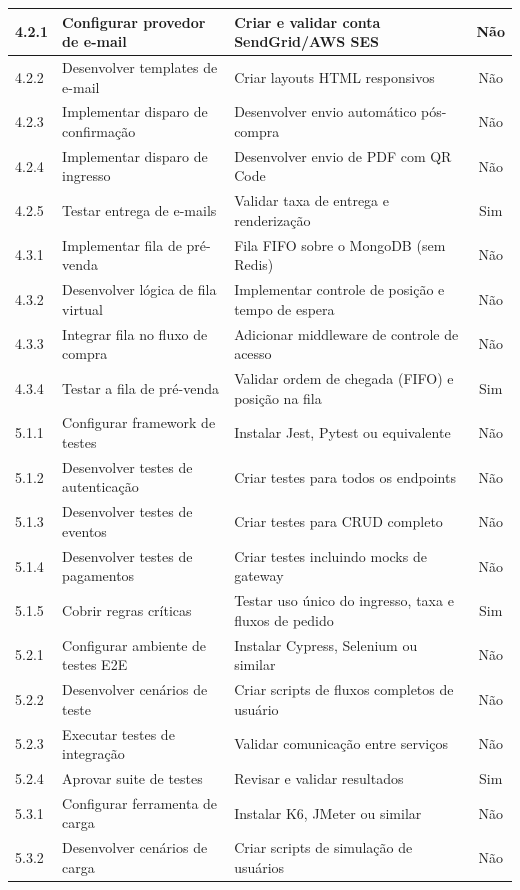 \begin{table}[H]
\begin{tabular}{|p{0.9cm}|p{6.2cm}|p{5.7cm}|c|}
4.2.1 & Configurar provedor de e-mail & Criar e validar conta SendGrid/AWS SES & Não \\ \hline
4.2.2 & Desenvolver templates de e-mail & Criar layouts HTML responsivos & Não \\ \hline
4.2.3 & Implementar disparo de confirmação & Desenvolver envio automático pós-compra & Não \\ \hline
4.2.4 & Implementar disparo de ingresso & Desenvolver envio de PDF com QR Code & Não \\ \hline
4.2.5 & Testar entrega de e-mails & Validar taxa de entrega e renderização & Sim \\ \hline
4.3.1 & Implementar fila de pré-venda & Fila FIFO sobre o MongoDB (sem Redis) & Não \\ \hline
4.3.2 & Desenvolver lógica de fila virtual & Implementar controle de posição e tempo de espera & Não \\ \hline
4.3.3 & Integrar fila no fluxo de compra & Adicionar middleware de controle de acesso & Não \\ \hline
4.3.4 & Testar a fila de pré-venda & Validar ordem de chegada (FIFO) e posição na fila & Sim \\ \hline
5.1.1 & Configurar framework de testes & Instalar Jest, Pytest ou equivalente & Não \\ \hline
5.1.2 & Desenvolver testes de autenticação & Criar testes para todos os endpoints & Não \\ \hline
5.1.3 & Desenvolver testes de eventos & Criar testes para CRUD completo & Não \\ \hline
5.1.4 & Desenvolver testes de pagamentos & Criar testes incluindo mocks de gateway & Não \\ \hline
5.1.5 & Cobrir regras críticas & Testar uso único do ingresso, taxa e fluxos de pedido & Sim \\ \hline
5.2.1 & Configurar ambiente de testes E2E & Instalar Cypress, Selenium ou similar & Não \\ \hline
5.2.2 & Desenvolver cenários de teste & Criar scripts de fluxos completos de usuário & Não \\ \hline
5.2.3 & Executar testes de integração & Validar comunicação entre serviços & Não \\ \hline
5.2.4 & Aprovar suite de testes & Revisar e validar resultados & Sim \\ \hline
5.3.1 & Configurar ferramenta de carga & Instalar K6, JMeter ou similar & Não \\ \hline
5.3.2 & Desenvolver cenários de carga & Criar scripts de simulação de usuários & Não \\ \hline

\end{tabular}
\end{table}
